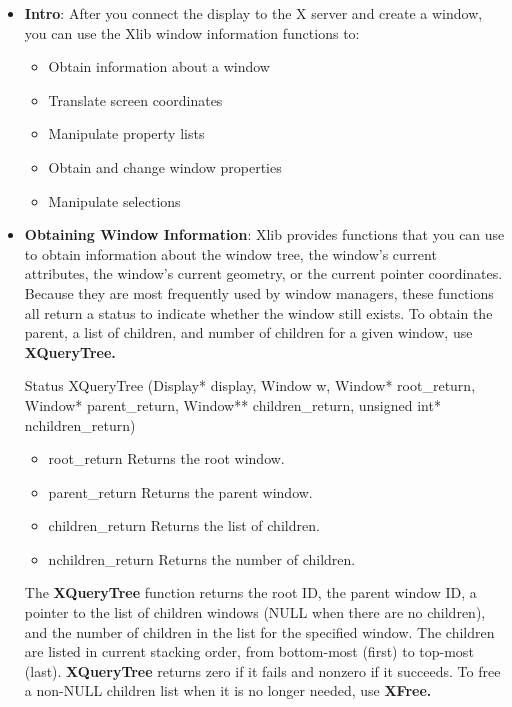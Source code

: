 \documentclass{report}
\begin{document}
    \pagebreak 
    \begin{itemize}
        \item \textbf{Intro}: After you connect the display to the X server and create a window, you can use the Xlib window information functions to:
            \begin{itemize}
                \item Obtain information about a window
                \item Translate screen coordinates
                \item Manipulate property lists
                \item Obtain and change window properties
                \item Manipulate selections
            \end{itemize}
        \item \textbf{Obtaining Window Information}: Xlib provides functions that you can use to obtain information about the window tree, the window’s current attributes, the window’s current geometry, or the current pointer coordinates. Because they are most frequently used by window managers, these functions all return a status to indicate whether the window still exists.
            \bigbreak \noindent 
            To obtain the parent, a list of children, and number of children for a given window, use \textbf{XQueryTree.}
            \bigbreak \noindent 
            \begin{cppcode}
            Status XQueryTree (Display* display, Window w, Window* root_return, Window* parent_return, Window** children_return, unsigned int* nchildren_return)
            \end{cppcode}
            \bigbreak \noindent
            \begin{itemize}
                \item root\_return Returns the root window.
                \item parent\_return Returns the parent window.
                \item children\_return Returns the list of children.
                \item nchildren\_return Returns the number of children.
            \end{itemize}
            The \textbf{XQueryTree} function returns the root ID, the parent window ID, a pointer to the list of children windows (NULL when there are no children), and the number of children in the list for the specified window. The children are listed in current stacking order, from bottom-most (first) to top-most (last). \textbf{XQueryTree} returns zero if it fails and nonzero if it succeeds. To free a non-NULL children list when it is no longer needed, use \textbf{XFree.}

\end{itemize}
\end{document}
